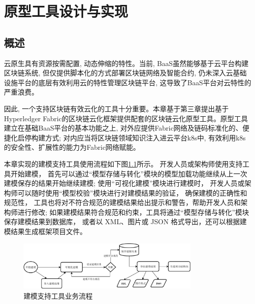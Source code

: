 \chapter{原型工具设计与实现}

\section{概述}


云原生具有资源按需配置, 动态伸缩的特性。当前, BaaS虽然能够基于云平台构建区块链系统, 但仅提供脚本化的方式部署区块链网络及智能合约, 仍未深入云基础设施平台的底层有效利用云的特性管理区块链平台, 这导致了BaaS平台对云特性的严重浪费。

因此, 一个支持区块链有效云化的工具十分重要。本章基于第三章提出基于Hyperledger Fabric的区块链云化框架提供配套的区块链云化原型工具。原型工具建立在基础BaaS平台的基本功能之上, 对外应提供Fabric网络及链码标准化的、便捷化启停构建方式; 对内应当将区块链领域知识注入进云平台k8s中, 有效利用k8s的安全性、扩展性的能力为Fabric网络赋能。




本章实现的建模支持工具使用流程如下图\ref{toolprocess}所示。
开发人员或架构师使用支持工具开始建模，
首先可以通过“模型存储与转化”模块的模型加载功能继续从上一次建模保存的结果开始继续建模;
使用“可视化建模”模块进行建模时，
开发人员或架构师可以随时使用“模型校验”模块进行对建模结果的验证，
确保建模的正确性和规范性，
工具也将对不符合规范的建模结果给出提示和警告，帮助开发人员和架构师进行修改;
如果建模结果符合规范和约束，工具将通过“模型存储与转化”模块保存建模结果到数据库， 
或者以 XML、图片或 JSON 格式导出，还可以根据建模结果生成框架项目文件。


\begin{figure}[!htbp] %
    \centering %
    \includegraphics[width=0.8\textwidth]{FIGs/chapter4/toolprocess.pdf} %
    \caption{建模支持工具业务流程} %
    \label{toolprocess} %
\end{figure}%

